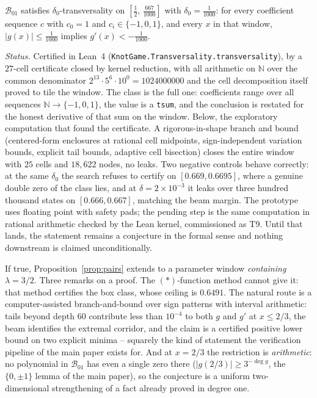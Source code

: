 \documentclass[11pt]{amsart}
\theoremstyle{remark}\newtheorem{remark}[lemma]{Remark}
\begin{document}
\begin{proposition}\label{conj:restricted}
$\mathcal B_{01}$ satisfies $\delta_0$-transversality on
$[\tfrac12,\,\tfrac{667}{1000}]$ with $\delta_0=\tfrac1{1000}$: for every
coefficient sequence $c$ with $c_0=1$ and $c_i\in\{-1,0,1\}$, and every $x$ in
that window, $|g(x)|\leq\tfrac1{1000}$ implies $g'(x)<-\tfrac1{1000}$.
\end{proposition}

\emph{Status.} Certified in Lean~4 (\texttt{KnotGame.Transversality.}\allowbreak\texttt{transversality}),
by a $27$-cell certificate closed by kernel reduction, with all arithmetic on
$\mathbb N$ over the common denominator $2^{13}\cdot5^6\cdot 10^{0}=1024000000$
and the cell decomposition itself proved to tile the window. The class is the
full one: coefficients range over all sequences $\mathbb N\to\{-1,0,1\}$, the
value is a \texttt{tsum}, and the conclusion is restated for the honest
derivative of that sum on the window. Below, the exploratory computation that
found the certificate. A rigorous-in-shape branch and bound (centered-form enclosures
at rational cell midpoints, sign-independent variation bounds, explicit tail
bounds, adaptive cell bisection) closes the entire window with $25$ cells and
$18{,}622$ nodes, no leaks. Two negative controls behave correctly: at the
same $\delta_0$ the search refuses to certify on $[0.669,0.6695]$, where a
genuine double zero of the class lies, and at $\delta=2\times10^{-3}$ it leaks
over three hundred thousand states on $[0.666,0.667]$, matching the beam
margin. The prototype uses floating point with safety pads; the pending step
is the same computation in rational arithmetic checked by the Lean kernel,
commissioned as T9. Until that lands, the statement remains a conjecture in
the formal sense and nothing downstream is claimed unconditionally.

If true, Proposition~\ref{prop:pairs} extends to a parameter window
\emph{containing} $\lambda=3/2$. Three remarks on a proof. The
$(*)$-function method cannot give it: that method certifies the box class,
whose ceiling is $0.6491$. The natural route is a computer-assisted
branch-and-bound over sign patterns with interval arithmetic: tails beyond
depth $60$ contribute less than $10^{-4}$ to both $g$ and $g'$ at $x\leq2/3$,
the beam identifies the extremal corridor, and the claim is a certified
positive lower bound on two explicit minima -- squarely the kind of statement
the verification pipeline of the main paper exists for. And at $x=2/3$ the
restriction is \emph{arithmetic}: no polynomial in $\mathcal B_{01}$ has even
a single zero there ($|g(2/3)|\geq3^{-\deg g}$, the $\{0,\pm1\}$ lemma of the
main paper), so the conjecture is a uniform two-dimensional strengthening of
a fact already proved in degree one.
\end{document}
